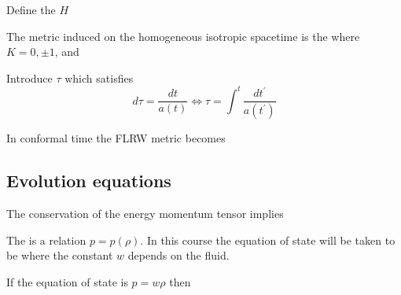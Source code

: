 \documentclass{article}
\begin{document}
\begin{definition}
Define the  $H$
\end{definition}

\begin{definition}
The metric induced on the homogeneous isotropic spacetime is the  
where $K = 0, \pm1$, and 
\end{definition}

\begin{definition}
Introduce  $\tau$ which satisfies 
\[
d\tau = \frac{dt}{a(t)} \Leftrightarrow \tau = \int^t \frac{dt^\prime}{a(t^\prime)}
\]
\end{definition}

In conformal time the FLRW metric becomes 

\subsection{Evolution equations}

\begin{definition}
The conservation of the energy momentum tensor implies 
\end{definition}

\begin{definition}
The  is a relation $p=p(\rho)$. In this course the equation of state will be taken to be 
where the constant $w$ depends on the fluid.
\end{definition}

\begin{prop}
If the equation of state is $p = w\rho$ then 
\end{prop}
\end{document}
